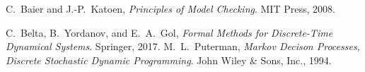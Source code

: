 \documentclass[letterpaper, 10 pt, conference]{ieeeconf}  %
\begin{document}
\begin{thebibliography}{99}
C.\ Baier and J.-P.\ Katoen,
\textit{Principles of Model Checking}.
MIT Press, 2008.

C.\ Belta, B.\ Yordanov, and E.\ A.\ Gol,
\textit{Formal Methods for Discrete-Time Dynamical Systems}.
Springer, 2017.
M.\ L.\ Puterman,
\textit{Markov Decison Processes, Discrete Stochastic Dynamic Programming}.
John Wiley \& Sons, Inc., 1994.


\end{thebibliography}
\end{document}
